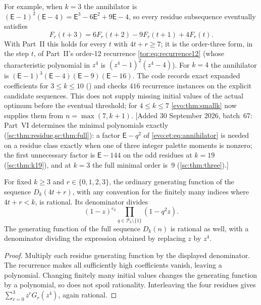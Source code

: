 \documentclass[11pt,a4paper]{article}
\numberwithin{equation}{section}
\theoremstyle{definition}
\theoremstyle{remark}
\begin{document}
For example, when $k=3$ the annihilator is
$(\mathsf E-1)^2(\mathsf E-4)=\mathsf E^3-6\mathsf E^2+9\mathsf E-4$, so every
residue subsequence eventually satisfies
\begin{equation}\label{evo:et:eq:rec3}
 F_r(t+3)=6F_r(t+2)-9F_r(t+1)+4F_r(t).
\end{equation}
With Part~II this holds for every $t$ with $4t+r\ge7$; it is the order-three
form, in the step $t$, of Part~II's order-12 recurrence
\eqref{tor:eq:recurrence12} (whose characteristic polynomial in $z^4$ is
$(z^4-1)^2(z^4-4)$). For $k=4$ the annihilator is
$(\mathsf E-1)^3(\mathsf E-4)(\mathsf E-9)(\mathsf E-16)$. The code records
exact expanded coefficients for $3\le k\le10$
() and checks $416$ recurrence
instances on the explicit candidate sequences. This does not supply missing
initial values of the actual optimum before the eventual threshold; for
$4\le k\le7$ \cref{evo:thm:smallk} now supplies them from $n=\max(7,k+1)$.
[Added 30 September 2026, batch~67: Part~VI determines the minimal polynomials exactly
(\cref{sc:thm:residue,sc:thm:full}): a factor $\mathsf E-q^2$ of
\eqref{evo:et:eq:annihilator} is needed on a residue class exactly when one
of three integer palette moments is nonzero; the first unnecessary factor
is $\mathsf E-144$ on the odd residues at $k=19$ (\cref{sc:thm:k19}), and at
$k=3$ the full minimal order is~$9$ (\cref{sc:thm:three}).]

\begin{corollary}\label{evo:et:cor:rational}
For fixed $k\ge3$ and $r\in\{0,1,2,3\}$, the ordinary generating function of
the sequence $D_k(4t+r)$, with any convention for the finitely many indices
where $4t+r<k$, is rational. Its denominator divides
\[
 (1-z)^{e_k}\prod_{q\in\mathcal P_k\setminus\{1\}}(1-q^2z).
\]
The generating function of the full sequence $D_k(n)$ is rational as well,
with a denominator dividing the expression obtained by replacing $z$ by $z^4$.
\end{corollary}
\begin{proof}
Multiply each residue generating function by the displayed denominator. The
recurrence makes all sufficiently high coefficients vanish, leaving a
polynomial. Changing finitely many initial values changes the generating
function by a polynomial, so does not spoil rationality. Interleaving the four
residues gives $\sum_{r=0}^3z^rG_r(z^4)$, again rational.
\end{proof}
\end{document}
